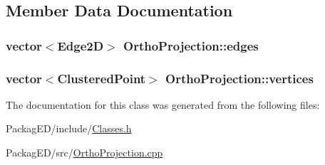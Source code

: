 \subsection{Member Data Documentation}
\subsubsection[{\texorpdfstring{edges}{edges}}]{\setlength{\rightskip}{0pt plus 5cm}vector$<${\bf Edge2D}$>$ Ortho\+Projection\+::edges}\hypertarget{class_ortho_projection_ae2512ad3cf754d708b2c8976806b4400}{}\label{class_ortho_projection_ae2512ad3cf754d708b2c8976806b4400}
\subsubsection[{\texorpdfstring{vertices}{vertices}}]{\setlength{\rightskip}{0pt plus 5cm}vector$<${\bf Clustered\+Point}$>$ Ortho\+Projection\+::vertices}\hypertarget{class_ortho_projection_ada31a302b74c5539788b9f2573c1a0a4}{}\label{class_ortho_projection_ada31a302b74c5539788b9f2573c1a0a4}


The documentation for this class was generated from the following files\+:\begin{DoxyCompactItemize}
\item 
Packag\+E\+D/include/\hyperlink{_classes_8h}{Classes.\+h}\item 
Packag\+E\+D/src/\hyperlink{_ortho_projection_8cpp}{Ortho\+Projection.\+cpp}\end{DoxyCompactItemize}
